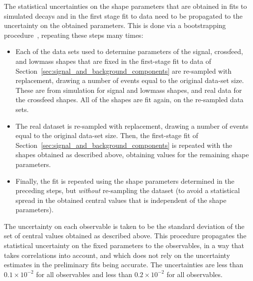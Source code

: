 The statistical uncertainties on the shape parameters that are obtained in fits to simulated decays and in the first stage fit to data need to be propagated to the uncertainty on the obtained parameters. This is done via a bootstrapping procedure~\cite{ChernickMichaelR1999Bm:a}, repeating these steps many times:
\begin{itemize}
    \item Each of the data sets used to determine parameters of the signal, crossfeed, and lowmass shapes that are fixed in the first-stage fit to data of Section~\ref{sec:signal_and_background_components} are re-sampled with replacement, drawing a number of events equal to the original data-set size. These are from simulation for signal and lowmass shapes, and real data for the crossfeed shapes. All of the shapes are fit again, on the re-sampled data sets.
    \item The real dataset is re-sampled with replacement, drawing a number of events equal to the original data-set size. Then, the first-stage fit of Section~\ref{sec:signal_and_background_components} is repeated with the shapes obtained as described above, obtaining values for the remaining shape parameters.
    \item Finally, the \CP fit is repeated using the shape parameters determined in the preceding steps, but \emph{without} re-sampling the dataset (to avoid a statistical spread in the obtained central values that is independent of the shape parameters).
\end{itemize}
The uncertainty on each observable is taken to be the standard deviation of the set of central values obtained as described above. This procedure propagates the statistical uncertainty on the fixed parameters to the observables, in a way that takes correlations into account, and which does not rely on the uncertainty estimates in the preliminary fits being accurate. The uncertainties are less than $0.1\times 10^{-2}$ for all \DK observables and less than $0.2\times 10^{-2}$ for all \Dpi observables.


